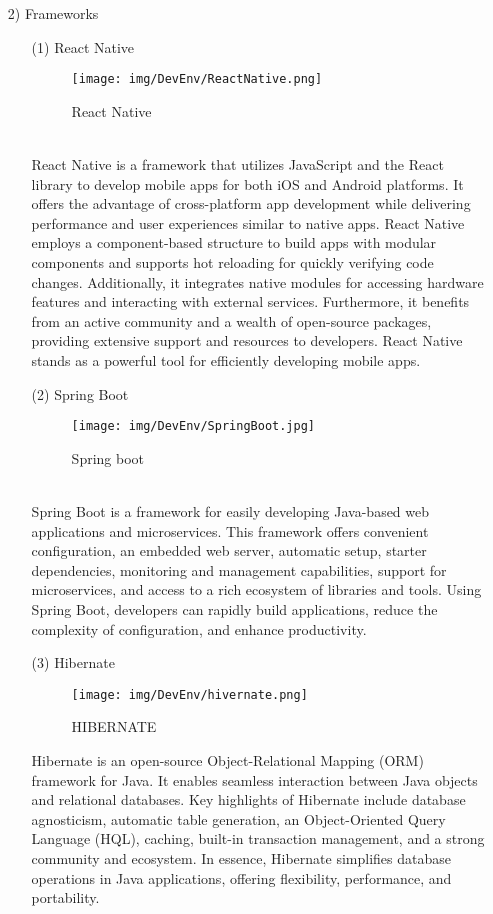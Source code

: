\documentclass[conference]{IEEEtran}
\begin{document}
\begin{enumerate}
\begin{itemize}
\begin{itemize}
\end{itemize}
\item [2)] Frameworks
\begin{itemize}
\item [(1)] React Native\cite{ReactNative}
\begin{figure}[h]
\centering
\texttt{[image: img/DevEnv/ReactNative.png]}
\caption{React Native} 
\end{figure}\\
React Native is a framework that utilizes JavaScript and the React library to develop mobile apps for both iOS and Android platforms. It offers the advantage of cross-platform app development while delivering performance and user experiences similar to native apps. React Native employs a component-based structure to build apps with modular components and supports hot reloading for quickly verifying code changes. Additionally, it integrates native modules for accessing hardware features and interacting with external services. Furthermore, it benefits from an active community and a wealth of open-source packages, providing extensive support and resources to developers. React Native stands as a powerful tool for efficiently developing mobile apps.\\

\item [(2)] Spring Boot\cite{SpringBoot}
\begin{figure}[h]
\centering
\texttt{[image: img/DevEnv/SpringBoot.jpg]}
\caption{Spring boot} 
\end{figure}\\
Spring Boot is a framework for easily developing Java-based web applications and microservices. This framework offers convenient configuration, an embedded web server, automatic setup, starter dependencies, monitoring and management capabilities, support for microservices, and access to a rich ecosystem of libraries and tools. Using Spring Boot, developers can rapidly build applications, reduce the complexity of configuration, and enhance productivity.\\

\item [(3)] Hibernate\cite{Hivernate}\\
\begin{figure}[h]
\centering
\texttt{[image: img/DevEnv/hivernate.png]}
\caption{HIBERNATE} 
\end{figure}
Hibernate is an open-source Object-Relational Mapping (ORM) framework for Java. It enables seamless interaction between Java objects and relational databases. Key highlights of Hibernate include database agnosticism, automatic table generation, an Object-Oriented Query Language (HQL), caching, built-in transaction management, and a strong community and ecosystem. In essence, Hibernate simplifies database operations in Java applications, offering flexibility, performance, and portability. \\


\end{itemize}
\end{itemize}
\end{enumerate}
\end{document}
